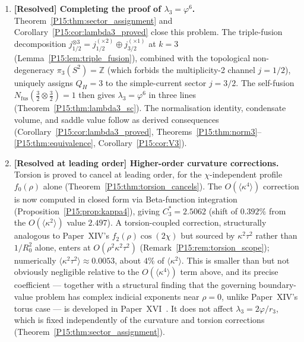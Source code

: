 \documentclass[11pt,a4paper]{article}
\theoremstyle{definition}\newtheorem{definition}[theorem]{Definition}
\theoremstyle{remark}
\newcommand{\vp}{\varphi}
\newcommand{\lam}{\lambda}
\newcommand{\QH}{Q_H}
\begin{document}
\begin{enumerate}[noitemsep,label=(\roman*)]
\item \textbf{[Resolved] Completing the proof of $\lam_3=\vp^6$.}
  Theorem~\ref{P15:thm:sector_assignment} and
  Corollary~\ref{P15:cor:lambda3_proved} close this problem.
  The triple-fusion decomposition
  $j_{1/2}^{\otimes 3}=j_{1/2}^{(\times 2)}\oplus j_{3/2}^{(\times 1)}$
  at $k=3$ (Lemma~\ref{P15:lem:triple_fusion}), combined with
  the topological non-degeneracy $\pi_3(S^2)=\mathbb{Z}$
  (which forbids the multiplicity-2 channel $j=1/2$),
  uniquely assigns $\QH=3$ to the simple-current sector $j=3/2$.
  The self-fusion $N_{\mathrm{fus}}(\tfrac32\otimes\tfrac32)=1$
  then gives $\lam_3=\vp^6$ in three lines
  (Theorem~\ref{P15:thm:lambda3_sc}).
  The normalisation identity, condensate volume, and saddle value
  follow as derived consequences
  (Corollary~\ref{P15:cor:lambda3_proved},
  Theorems~\ref{P15:thm:norm3}--\ref{P15:thm:equivalence},
  Corollary~\ref{P15:cor:V3}).

\item \textbf{[Resolved at leading order] Higher-order curvature
  corrections.}
  Torsion is proved to cancel at leading order, for the
  $\chi$-independent profile $f_0(\rho)$ alone
  (Theorem~\ref{P15:thm:torsion_cancels}).
  The $O(\langle\kappa^4\rangle)$ correction is now computed in closed form
  via Beta-function integration (Proposition~\ref{P15:prop:kappa4}),
  giving $C_3^* = 2.5062$ (shift of $0.392\%$ from the
  $O(\langle\kappa^2\rangle)$ value $2.497$).
  A torsion-coupled correction, structurally analogous to Paper~XIV's
  $f_2(\rho)\cos(2\chi)$ but sourced by $\kappa^2\tau^2$ rather than
  $1/R_0^2$ alone, enters at $O(\rho^2\kappa^2\tau^2)$
  (Remark~\ref{P15:rem:torsion_scope}); numerically
  $\langle\kappa^2\tau^2\rangle\approx 0.0053$, about $4\%$ of
  $\langle\kappa^2\rangle$. This is smaller than but not obviously
  negligible relative to the $O(\langle\kappa^4\rangle)$ term above,
  and its precise coefficient --- together with a structural finding
  that the governing boundary-value problem has complex indicial
  exponents near $\rho=0$, unlike Paper~XIV's torus case --- is
  developed in Paper~XVI~\cite{Paper16}. It does not affect
  $\lam_3=2\vp/r_3$, which is fixed independently of the curvature
  and torsion corrections
  (Theorem~\ref{P15:thm:sector_assignment}).


\end{enumerate}
\end{document}
